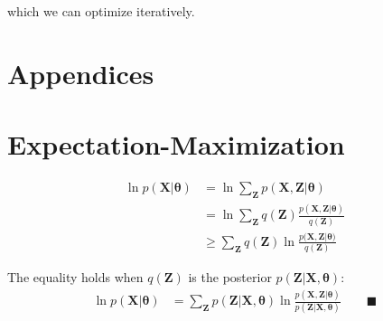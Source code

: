 \documentclass[smallextended]{svjour3}          %
\begin{document}
which we can optimize iteratively.
\newpage
\appendix
\section*{Appendices}
\section{Expectation-Maximization}

\begin{align}
\ln p(\mathbf{X} | \boldsymbol{\theta}) &=  \ln \sum_{\mathbf{Z}}  p(\mathbf{X}, \mathbf{Z}  | \boldsymbol{\theta}) \\
&=\ln \sum_{\mathbf{Z}} q(\mathbf{Z}) \frac{p(\mathbf{X}, \mathbf{Z}  | \boldsymbol{\theta})}{ q(\mathbf{Z})}\\
&\geq \sum_{\mathbf{Z}} q(\mathbf{Z}) \ln \frac{p(\mathbf{X}, \mathbf{Z} | \boldsymbol{\theta)}}{q(\mathbf{Z})}
\end{align}


The equality holds when $q(\mathbf{Z})$ is the posterior $p(\mathbf{Z} | \mathbf{X}, \boldsymbol{\theta})$:
\begin{align}
\ln p(\mathbf{X} | \boldsymbol{\theta}) &=  \sum_{\mathbf{Z}} p(\mathbf{Z} | \mathbf{X}, \boldsymbol{\theta}) \ln \frac{p(\mathbf{X, Z} | \boldsymbol{\theta})}{ p(\mathbf{Z} | \mathbf{X}, \boldsymbol{\theta})} \qquad \blacksquare
\label{eq:em_general}
\end{align}
 

\end{document}

